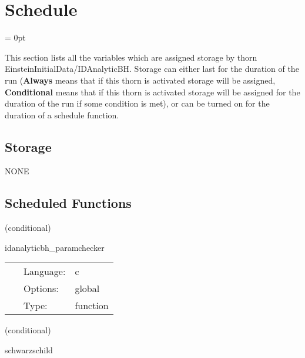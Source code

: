 
\section{Schedule} 


\parskip = 0pt


\noindent This section lists all the variables which are assigned storage by thorn EinsteinInitialData/IDAnalyticBH.  Storage can either last for the duration of the run ({\bf Always} means that if this thorn is activated storage will be assigned, {\bf Conditional} means that if this thorn is activated storage will be assigned for the duration of the run if some condition is met), or can be turned on for the duration of a schedule function.


\subsection*{Storage}NONE
\subsection*{Scheduled Functions}
\vspace{5mm}

   (conditional) 

\hspace{5mm} idanalyticbh\_paramchecker 

\hspace{5mm}{\it construct parameters for analytic black hole solutions } 


\hspace{5mm}

 \begin{tabular*}{160mm}{cll} 
~ & Language:  & c \\ 
~ & Options:  & global \\ 
~ & Type:  & function \\ 
\end{tabular*} 


\vspace{5mm}

   (conditional) 

\hspace{5mm} schwarzschild 

\hspace{5mm}{\it construct initial data for a single schwarzschild black hole } 


\hspace{5mm}

